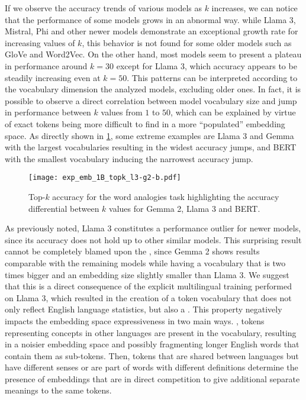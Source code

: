 If we observe the accuracy trends of various models as $k$ increases, we can notice that the performance of some models grows in an abnormal way.
 while Llama 3, Mistral, Phi and other newer models demonstrate an exceptional growth rate for increasing values of $k$, this behavior is not found for some older models such as GloVe and Word2Vec.
On the other hand, most models seem to present a plateau in performance around $k = 30$ except for Llama 3, which accuracy appears to be steadily increasing even at $k = 50$.
This patterns can be interpreted according to the vocabulary dimension the analyzed models, excluding older ones.
In fact, it is possible to observe a direct correlation between model vocabulary size and jump in performance between $k$ values from $1$ to $50$, which can be explained by virtue of exact tokens being more difficult to find in a more ``populated'' embedding space.
As directly shown in \cref{fig:exp_emb_1_B}, some extreme examples are Llama 3 and Gemma with the largest vocabularies resulting in the widest accuracy jumps, and BERT with the smallest vocabulary inducing the narrowest accuracy jump.

\begin{figure}[t!]
    \centering
    \texttt{[image: exp\_emb\_1B\_topk\_l3-g2-b.pdf]}
    \caption[Top-$k$ accuracy for the word analogies task highlighting the accuracy differential between $k$ values for various models.]{Top-$k$ accuracy for the word analogies task highlighting the accuracy differential between $k$ values for Gemma 2, Llama 3 and BERT.}
    \label{fig:exp_emb_1_B}
\end{figure}

As previously noted, Llama 3 constitutes a performance outlier for newer models, since its accuracy does not hold up to other similar models.
This surprising result cannot be completely blamed upon the , since Gemma 2 shows results comparable with the remaining models while having a vocabulary that is two times bigger and an embedding size slightly smaller than Llama 3.
We suggest that this is a direct consequence of the explicit multilingual training performed on Llama 3, which resulted in the creation of a token vocabulary that does not only reflect English language statistics, but also a .
This property negatively impacts the embedding space expressiveness in two main ways.
, tokens representing concepts in other languages are present in the vocabulary, resulting in a noisier embedding space and possibly fragmenting longer English words that contain them as sub-tokens.
Then, tokens that are shared between languages but have different senses or are part of words with different definitions determine the presence of embeddings that are in direct competition to give additional separate meanings to the same tokens.

